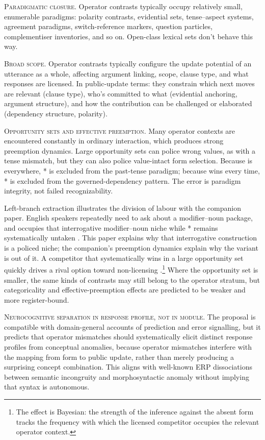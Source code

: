 \documentclass[12pt,letterpaper]{article}
\begin{document}
{\sloppy \textsc{Paradigmatic closure.} Operator contrasts typically occupy relatively small, enumerable paradigms: polarity contrasts, evidential sets, tense--aspect systems, agreement paradigms, switch-reference markers, question particles, complementiser inventories, and so on. Open-class lexical sets don't behave this way.\par}

\textsc{Broad scope.} Operator contrasts typically configure the update potential of an utterance as a whole, affecting argument linking, scope, clause type, and what responses are licensed. In public-update terms: they constrain which next moves are relevant (clause type), who's committed to what (evidential anchoring, argument structure), and how the contribution can be challenged or elaborated (dependency structure, polarity).

\textsc{Opportunity sets and effective preemption.} Many operator contexts are encountered constantly in ordinary interaction, which produces strong preemption dynamics. Large opportunity sets can police wrong values, as with a tense mismatch, but they can also police value-intact form selection. Because  is everywhere, * is excluded from the past-tense paradigm; because  wins every time, * is excluded from the governed-dependency pattern. The error is paradigm integrity, not failed recognizability.

Left-branch extraction illustrates the division of labour with the companion paper. English speakers repeatedly need to ask about a modifier--noun package, and  occupies that interrogative modifier--noun niche while * remains systematically untaken \citep{reynolds2026lbe}. This paper explains why that interrogative construction is a policed niche; the companion's preemption dynamics explain why the variant is out of it. A competitor that systematically wins in a large opportunity set quickly drives a rival option toward non-licensing \citep{bybee2006,bybee2010}.\footnote{The effect is Bayesian: the strength of the inference against the absent form tracks the frequency with which the licensed competitor occupies the relevant operator context.} Where the opportunity set is smaller, the same kinds of contrasts may still belong to the operator stratum, but categoricality and effective-preemption effects are predicted to be weaker and more register-bound.

\textsc{Neurocognitive separation in response profile, not in module.} The proposal is compatible with domain-general accounts of prediction and error signalling, but it predicts that operator mismatches should systematically elicit distinct response profiles from conceptual anomalies, because operator mismatches interfere with the mapping from form to public update, rather than merely producing a surprising concept combination. This aligns with well-known ERP dissociations between semantic incongruity and morphosyntactic anomaly \citep{kutashillyard1980,osterhoutholcomb1992,friederici2011} without implying that syntax is autonomous.
\end{document}
